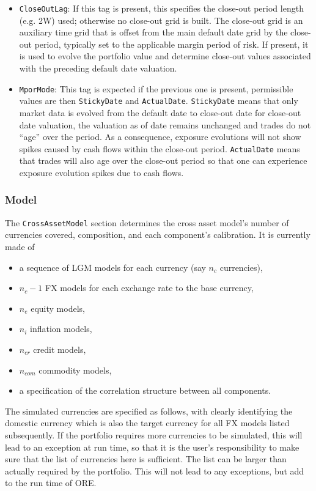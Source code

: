 \begin{itemize}
{  SobolLevitan, SobolLevitanLemieux, JoeKuoD5, JoeKuoD6, JoeKuoD7, Kuo, Kuo2, Kuo3})
\item {\tt CloseOutLag}: If this tag is present, this specifies the close-out period length (e.g. 2W) used; otherwise no close-out grid is built. The close-out grid is an auxiliary time grid that is offset from the main default date grid by the close-out period, typically set to the applicable margin period of risk. If present, it is used to evolve the portfolio value and determine close-out values associated with the preceding default date valuation.
\item {\tt MporMode}: This tag is expected if the previous one is present, permissible values are then {\tt StickyDate} and {\tt ActualDate}. {\tt StickyDate} means that only market data is evolved from the default date to close-out date for close-out date valuation, the valuation as of date remains unchanged and trades do not ``age'' over the period. As a consequence, exposure evolutions will not show spikes caused by cash flows within the close-out period. {\tt ActualDate} means that trades will also age over the close-out period so that one can experience exposure evolution spikes due to cash flows.
\end{itemize}

\subsubsection{Model}\label{sec:sim_model}

The {\tt CrossAssetModel} section determines the cross asset model's number of currencies covered, composition, and each
component's calibration. It is currently made of
\begin{itemize}
\item a sequence of LGM models for each currency (say $n_c$ currencies),
\item $n_c-1$ FX models for each exchange rate to the base currency,
\item $n_e$ equity models,
\item $n_i$ inflation models,
\item $n_{cr}$ credit models,
\item $n_{com}$ commodity models,
\item a specification of the correlation structure between all components.
\end{itemize}

\medskip The simulated currencies are specified as follows, with clearly identifying the domestic currency which is also
the target currency for all FX models listed subsequently. If the portfolio requires more currencies to be simulated,
this will lead to an exception at run time, so that it is the user's responsibility to make sure that the list of
currencies here is sufficient. The list can be larger than actually required by the portfolio. This will not lead to any
exceptions, but add to the run time of ORE.

